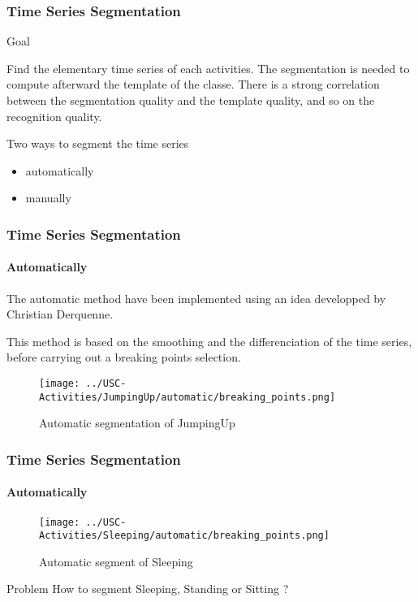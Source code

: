 \documentclass[11pt, sans, handout]{beamer}
\begin{document}
\begin{frame}
	\frametitle{Time Series Segmentation}
	 
	 \begin{alertblock}{Goal}

		Find the elementary time series of each activities. The segmentation is needed to compute afterward the template of the classe. There is a strong correlation between the segmentation quality and the template quality, and so on the recognition quality.

	\end{alertblock}
	
	\begin{block}{Two ways to segment the time series}
	\begin{itemize}
		\item automatically
		\item manually
	\end{itemize}
	\end{block}

\end{frame}

\begin{frame}
	\frametitle{Time Series Segmentation}
	\framesubtitle{Automatically}
	
	The automatic method have been implemented using an idea developped by Christian Derquenne\cite{derquenne}. 
	
	This method is based on the smoothing and the differenciation of the time series, before carrying out a breaking points selection.	
	
	\begin{figure}
	\texttt{[image: ../USC-Activities/JumpingUp/automatic/breaking\_points.png]}
	\caption{Automatic segmentation of JumpingUp}
	\end{figure}

\end{frame}

\begin{frame}
	\frametitle{Time Series Segmentation}
	\framesubtitle{Automatically}
	
	\begin{figure}
	\texttt{[image: ../USC-Activities/Sleeping/automatic/breaking\_points.png]}
	\caption{Automatic segment of Sleeping}
	\end{figure}
	
	\begin{exampleblock}{Problem}
	How to segment Sleeping, Standing or Sitting ?
	\end{exampleblock}
	
\end{frame}
\end{document}
